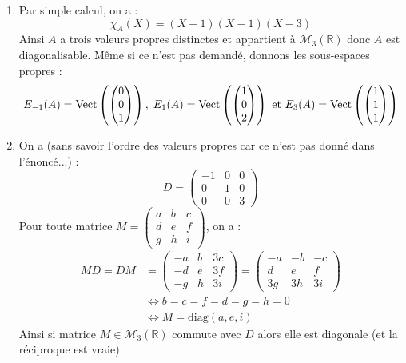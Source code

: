 \documentclass[a4paper,10pt]{report}
\begin{document}
\begin{enumerate}
\item Par simple calcul, on a :
$$ \chi_A(X)=(X+1)(X-1)(X-3)$$
Ainsi $A$ a trois valeurs propres distinctes et appartient à $\mathcal{M}_3(\mathbb{R})$ donc $A$ est diagonalisable. Même si ce n'est pas demandé, donnons les sous-espaces propres :
$$ E_{-1}(A) = \textrm{Vect} \left( \begin{pmatrix}
0 \\
0 \\
1
\end{pmatrix} \right), \; E_{1}(A) = \textrm{Vect} \left( \begin{pmatrix}
1 \\
0 \\
2
\end{pmatrix} \right) \hbox{ et } E_{3}(A) = \textrm{Vect} \left( \begin{pmatrix}
1 \\
1 \\
1
\end{pmatrix} \right) $$
\item On a (sans savoir l'ordre des valeurs propres car ce n'est pas donné dans l'énoncé...) :
$$ D = \begin{pmatrix}
-1 & 0 & 0 \\
0 & 1& 0 \\
0 & 0 & 3
\end{pmatrix}$$
Pour toute matrice $M = \begin{pmatrix}
a & b & c \\
d & e & f \\
g & h & i 
\end{pmatrix}$, on a :
\begin{align*}
MD=DM & =\begin{pmatrix}
-a & b & 3c \\
-d & e & 3f \\
-g & h & 3i 
\end{pmatrix} = \begin{pmatrix}
-a &- b & -c \\
d & e & f \\
3g & 3h & 3i 
\end{pmatrix} \\
& \Longleftrightarrow b=c=f=d=g=h=0 \\
& \Longleftrightarrow M= \textrm{diag}(a,e,i) 
\end{align*}
Ainsi si matrice $M \in \mathcal{M}_3(\mathbb{R})$ commute avec $D$ alors elle est diagonale (et la réciproque est vraie).

\end{enumerate}
\end{document}
